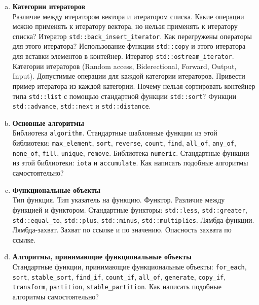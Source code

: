 \documentclass{article}
\begin{document}
\begin{enumerate}
\begin{enumerate}[a.]
\item \textbf{Категории итераторов}\\
Различие между итератором вектора и итератором списка. Какие операции можно применять к итератору вектора, но нельзя применять к итератору списка? Итератор \texttt{std::back\_insert\_iterator}. Как перегружены операторы для этого итератора? Использование функции \texttt{std::copy} и этого итератора для вставки элементов в контейнер. Итератор \texttt{std::ostream\_iterator}. Категории итераторов (Random access, Biderectional, Forward, Output, Input). Допустимые операции для каждой категории итераторов. Привести пример итератора из каждой категории. Почему нельзя сортировать контейнер типа \texttt{std::list} с помощью стандартной функции \texttt{std::sort}? Функции \texttt{std::advance}, \texttt{std::next} и \texttt{std::distance}.


\item \textbf{Основные алгоритмы}\\
Библиотека \texttt{algorithm}. Стандартные шаблонные функции из этой библиотеки: \texttt{max\_element}, \texttt{sort}, \texttt{reverse}, \texttt{count}, \texttt{find}, \texttt{all\_of}, \texttt{any\_of}, \texttt{none\_of}, \texttt{fill}, \texttt{unique}, \texttt{remove}. Библиотека \texttt{numeric}. Стандартные функции из этой библиотеки: \texttt{iota} и \texttt{accumulate}. Как написать подобные алгоритмы самостоятельно?


\item \textbf{Функциональные объекты}\\
Тип функция. Тип указатель на функцию. Функтор. Различие между функцией и функтором. Стандартные функторы: \texttt{std::less}, \texttt{std::greater}, \texttt{std::equal\_to}, \texttt{std::plus}, \texttt{std::minus}, \texttt{std::multiplies}. Лямбда-функции. Лямбда-захват. Захват по ссылке и по значению. Опасность захвата по ссылке.


\item \textbf{Алгоритмы, принимающие функциональные объекты}\\
Стандартные функции, принимающие функциональные объекты: \texttt{for\_each}, \texttt{sort}, \texttt{stable\_sort}, \texttt{find\_if}, \texttt{count\_if}, \texttt{all\_of}, \texttt{generate}, \texttt{copy\_if}, \texttt{transform}, \texttt{partition}, \texttt{stable\_partition}. Как написать подобные алгоритмы самостоятельно?

\end{enumerate}




\end{enumerate}
\end{document}
